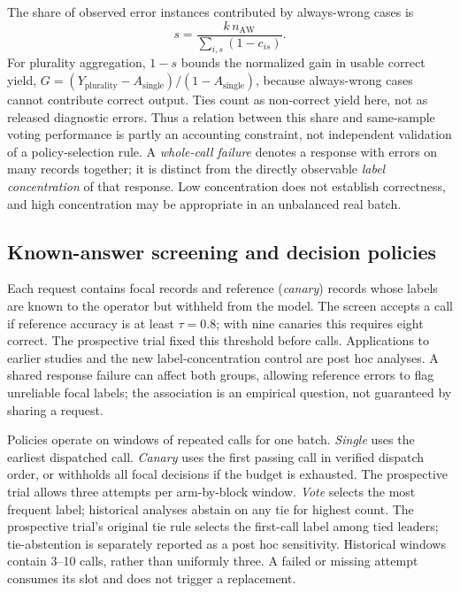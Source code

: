\documentclass[11pt,a4paper]{article}
\begin{document}
The share of observed error instances contributed by always-wrong cases is
\begin{equation}
s=\frac{k\,n_{\mathrm{AW}}}{\sum_{i,s}(1-c_{is})}.
\end{equation}
For plurality aggregation, $1-s$ bounds the normalized gain in usable correct yield, $G=(Y_{\mathrm{plurality}}-A_{\mathrm{single}})/(1-A_{\mathrm{single}})$, because always-wrong cases cannot contribute correct output. Ties count as non-correct yield here, not as released diagnostic errors. Thus a relation between this share and same-sample voting performance is partly an accounting constraint, not independent validation of a policy-selection rule. A \emph{whole-call failure} denotes a response with errors on many records together; it is distinct from the directly observable \emph{label concentration} of that response. Low concentration does not establish correctness, and high concentration may be appropriate in an unbalanced real batch.

\subsection{Known-answer screening and decision policies}\label{sec:canary}
Each request contains focal records and reference (\emph{canary}) records whose labels are known to the operator but withheld from the model. The screen accepts a call if reference accuracy is at least $\tau=0.8$; with nine canaries this requires eight correct. The prospective trial fixed this threshold before calls. Applications to earlier studies and the new label-concentration control are post hoc analyses. A shared response failure can affect both groups, allowing reference errors to flag unreliable focal labels; the association is an empirical question, not guaranteed by sharing a request.

Policies operate on windows of repeated calls for one batch. \emph{Single} uses the earliest dispatched call. \emph{Canary} uses the first passing call in verified dispatch order, or withholds all focal decisions if the budget is exhausted. The prospective trial allows three attempts per arm-by-block window. \emph{Vote} selects the most frequent label; historical analyses abstain on any tie for highest count. The prospective trial's original tie rule selects the first-call label among tied leaders; tie-abstention is separately reported as a post hoc sensitivity. Historical windows contain 3--10 calls, rather than uniformly three. A failed or missing attempt consumes its slot and does not trigger a replacement.
\end{document}
